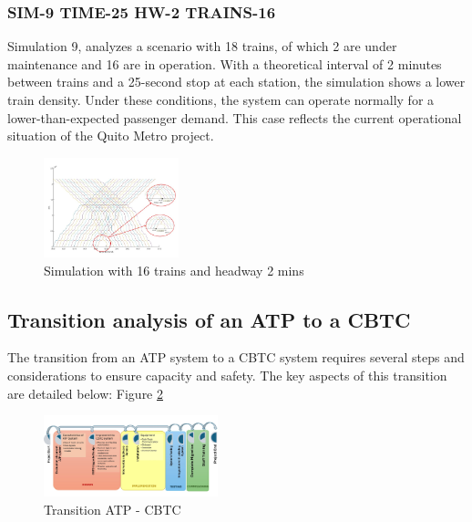 \documentclass[conference]{IEEEtran}
\begin{document}
\subsubsection{SIM-9 TIME-25 HW-2 TRAINS-16}
Simulation 9, analyzes a scenario with 18 trains, of which 2 are under maintenance and 16 are in operation\cite{b22}. With a theoretical interval of 2 minutes between trains and a 25-second stop at each station, the simulation shows a lower train density. Under these conditions, the system can operate normally for a lower-than-expected passenger demand. This case reflects the current operational situation of the Quito Metro project\cite{b21}.
\begin{figure}[h]
    \centering
\includegraphics[width=0.35\textwidth,scale=1]{Imagenes_general/SIM-9_TIME-25_HW-2_TRAINS-16.jpg}
    \caption{Simulation with 16 trains and headway 2 mins}
    \label{fig:Simulation 9: 16 Trains / 2 mins headway}
\end{figure}

\subsection{Transition analysis of an ATP to a CBTC}
The transition from an ATP system to a CBTC system requires several steps and considerations to ensure capacity and safety. The key aspects of this transition are detailed below: Figure \ref{fig:Transition ATP - CBTC}
\begin{figure}[h]
    \centering
\includegraphics[width=0.45\textwidth,scale=1]{Imagenes_general/PROCESOS_TRANSITION.jpg}
    \caption{Transition ATP - CBTC}
    \label{fig:Transition ATP - CBTC}
\end{figure}
\end{document}
